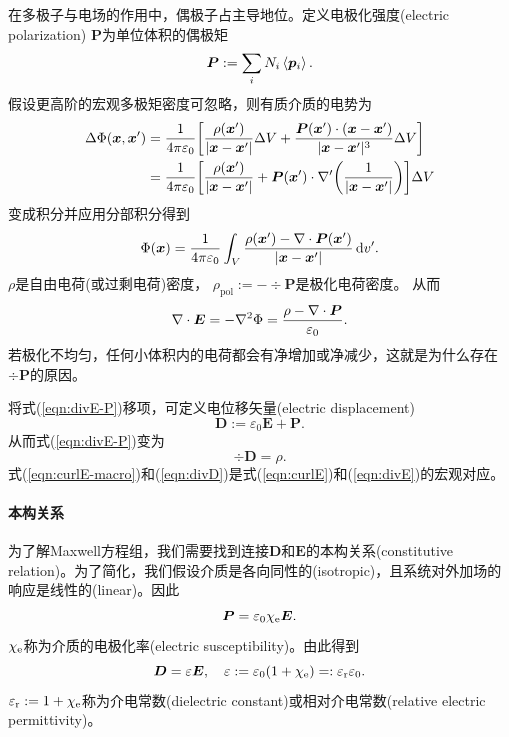 在多极子与电场的作用中，偶极子占主导地位。定义电极化强度(electric polarization) $\bm P$为单位体积的偶极矩
\begin{equation}
    \bm P:=\sum_i N_i\left\langle \bm p_i\right\rangle.
\end{equation}
假设更高阶的宏观多极矩密度可忽略，则有质介质的电势为
\begin{align*}
    \Delta\Phi(\bm x,\bm x')&=\frac1{4\pi\varepsilon_0}\biggl[\frac{\rho(\bm x')}{|\bm x-\bm x'|}\Delta V+\frac{\bm P(\bm x')\cdot(\bm x-\bm x')}{|\bm x-\bm x'|^3}\Delta V\biggr]\\
    &=\frac1{4\pi\varepsilon_0}\biggl[\frac{\rho(\bm x')}{|\bm x-\bm x'|}+\bm P(\bm x')\cdot\nabla'\biggl(\frac1{|\bm x-\bm x'|}\biggr)\biggr]\Delta V
\end{align*}
变成积分并应用分部积分得到
\begin{equation}
    \Phi(\bm x)=\frac1{4\pi\varepsilon_0}\int_V\frac{\rho(\bm x')-\nabla\cdot\bm P(\bm x')}{|\bm x-\bm x'|}\mathop{}\!\mathrm{d} v'.
\end{equation}
$\rho$是自由电荷(或过剩电荷)密度，
$\rho_\text{pol}:=-\div\bm P$是极化电荷密度。%
从而
\begin{equation}
    \label{eqn:divE-P}
    \nabla\cdot\bm E=-\nabla^2\Phi=\frac{\rho-\nabla\cdot\bm P}{\varepsilon_0}.
\end{equation}
若极化不均匀，任何小体积内的电荷都会有净增加或净减少，这就是为什么存在$\div\bm P$的原因。

将式(\ref{eqn:divE-P})移项，可定义电位移矢量(electric displacement)
\begin{equation}
    \bm D:=\varepsilon_0\bm E+\bm P.
\end{equation}
从而式(\ref{eqn:divE-P})变为 
\begin{equation}
    \label{eqn:divD}
    \div\bm D=\rho.
\end{equation}
式(\ref{eqn:curlE-macro})和(\ref{eqn:divD})是式(\ref{eqn:curlE})和(\ref{eqn:divE})的宏观对应。
\paragraph{本构关系}
为了解Maxwell方程组，我们需要找到连接$\bm D$和$\bm E$的本构关系(constitutive relation)。为了简化，我们假设介质是各向同性的(isotropic)，且系统对外加场的响应是线性的(linear)。因此
\begin{equation}
    \bm P=\varepsilon_0\chi_\mathrm e\bm E.
\end{equation}
$\chi_\mathrm e$称为介质的电极化率(electric susceptibility)。由此得到 
\begin{equation}
    \bm D=\varepsilon\bm E,\quad \varepsilon:=\varepsilon_0(1+\chi_\mathrm e)=:\varepsilon_\text r\varepsilon_0.
\end{equation}
$\varepsilon_\text r:=1+\chi_\mathrm e$称为介电常数(dielectric constant)或相对介电常数(relative electric permittivity)。

